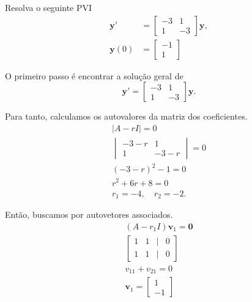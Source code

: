 \begin{exeresol}
  Resolva o seguinte PVI
  \begin{align}
    \pmb{y}' &=
    \begin{bmatrix}
      -3 & 1 \\
      1 & -3
    \end{bmatrix}\pmb{y},\\
    \pmb{y}(0) &=
                 \begin{bmatrix}
                   -1\\
                   1
                 \end{bmatrix}
  \end{align}
\end{exeresol}
\begin{resol}
  O primeiro passo é encontrar a solução geral de
  \begin{equation}
        \pmb{y}' = \begin{bmatrix}
      -3 & 1 \\
      1 & -3
    \end{bmatrix}\pmb{y}.
  \end{equation}

  Para tanto, calculamos os autovalores da matriz dos coeficientes.
  \begin{gather}
    |A-rI|=0\\
    \begin{vmatrix}
      -3-r & 1 \\
      1 & -3-r
    \end{vmatrix} = 0 \\
    (-3-r)^2-1=0 \\
    r^2+6r+8=0 \\
    r_1 = -4,\quad r_2=-2.
  \end{gather}

  Então, buscamos por autovetores associados.
  \begin{gather}
    (A-r_1I)\pmb{v}_1 = \pmb{0} \\
    \begin{bmatrix}
      1 & 1 & | & 0\\
      1 & 1 & | & 0
    \end{bmatrix}\\
    v_{11}+v_{21}=0\\
    \pmb{v}_1 =
    \begin{bmatrix}
      1\\
      -1
    \end{bmatrix}
  \end{gather}


\end{resol}
